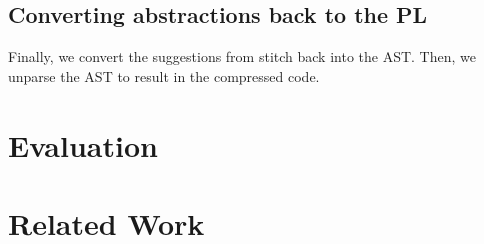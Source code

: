 \subsection{Converting abstractions back to the PL}
Finally, we convert the suggestions from stitch back into the AST. Then, we unparse the AST to result in the compressed code. 




\section{Evaluation}

\section{Related Work}


